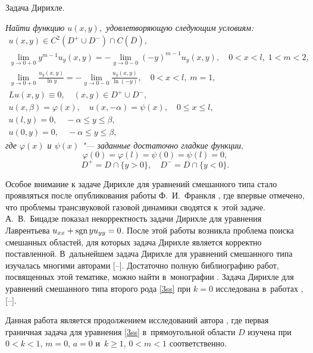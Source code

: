 \smallskip



{\small \sc Задача Дирихле.} {\it Найти  функцию $u(x,y),$ удовлетворяющую следующим условиям{\/\rm:}
\begin{gather}
\label{37rm} u(x,y)\in C^{2}(D^{+}\cup D^{-})\cap C(\overline{D}),
\\
\label{4014r} 
\lim\limits_{y\rightarrow
0+0}y^{m-1}u_{y}(x,y)=-\lim\limits_{y\rightarrow
0-0}(-y)^{m-1}u_{y}(x,y), \quad  0<x<l, \; 1<m<2,
\\
\label{4014r} 
\lim\limits_{y\rightarrow 0+0}\frac{u_{y}(x,y)}{\ln y}= -\lim\limits_{y\rightarrow 0-0}\frac{u_{y}(x,y)}{\ln
(-y)},\quad  0<x<l,\; m=1,
\\
\label{38r} Lu(x,y)\equiv 0, \quad  (x,y)\in D^{+}\cup D^{-},
\\
\label{40r}   u(x,\beta)=\varphi(x),\quad  u(x,-\alpha)=\psi(x), \quad  0\leq x\leq l,
\\
\label{39r}  u(l,y)=0, \quad  -\alpha\leq y\leq \beta,
\\
\label{39r1} u(0,y)=0, \quad  -\alpha\leq y\leq \beta,
\end{gather}
где  $\varphi(x)$  и $\psi(x)$ "--- заданные достаточно гладкие функции$,$ 
$$\varphi(0)=\varphi(l)=\psi(0)=\psi(l)=0,$$ 
$$D^{+}=D\cap \{y>0\},\quad D^{-}=D\cap \{y<0\}.$$

}

\smallskip

Особое внимание к задаче Дирихле для уравнений смешанного типа стало
проявляться после опубликования работы Ф.~И.~Франкля \cite{safina:Ffi1}, где впервые отмечено, что проблемы
трансзвуковой газовой динамики сводятся к~этой задаче. 
А.~В.~Бицадзе \cite{safina:Bav1} показал некорректность задачи Дирихле для уравнения Лаврентьева $u_{xx}+\mathop{\rm sgn}yu_{yy}=0 $. 
После  этой работы возникла проблема поиска смешанных областей, для которых задача Дирихле является корректно
поставленной. 
В~дальнейшем задача Дирихле для уравнений смешанного типа изучалась многими авторами [--]. 
Достаточно полную библиографию работ, посвященных этой тематике, можно найти в~монографии \cite{safina:Hach}. 
Задача Дирихле для уравнений смешанного типа второго рода \eqref{3ss} при $k=0$ исследована  в~работах \cite[c.~33--49]{safina:Hach}, [--].

Данная работа является продолжением исследований автора \cite{safina:Saf1, safina:SafDu}, где первая
граничная задача  для уравнения \eqref{3ss} в~прямоугольной области $D$ изучена при $0<k<1$, $m=0$, $a=0$ и~$k\geq1$, $0<m<1$ соответственно.

